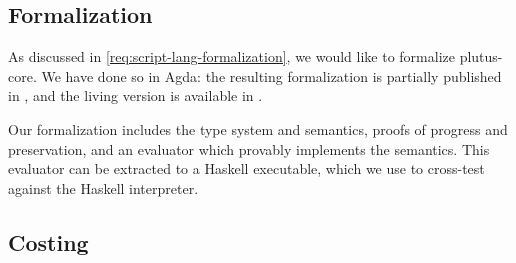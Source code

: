 \documentclass[plutus.tex]{subfiles}
\begin{document}
\subsection{Formalization}

As discussed in \cref{req:script-lang-formalization}, we would like to formalize \gls{plutus-core}.
We have done so in Agda: the resulting formalization is partially published in \textcite{chapman2019system}, and the living version is available in \textcite{plutus-repo}.

Our formalization includes the type system and semantics, proofs of progress and preservation, and an evaluator which provably implements the semantics.
This evaluator can be extracted to a Haskell executable, which we use to cross-test against the Haskell interpreter.

\subsection{Costing}

\end{document}
